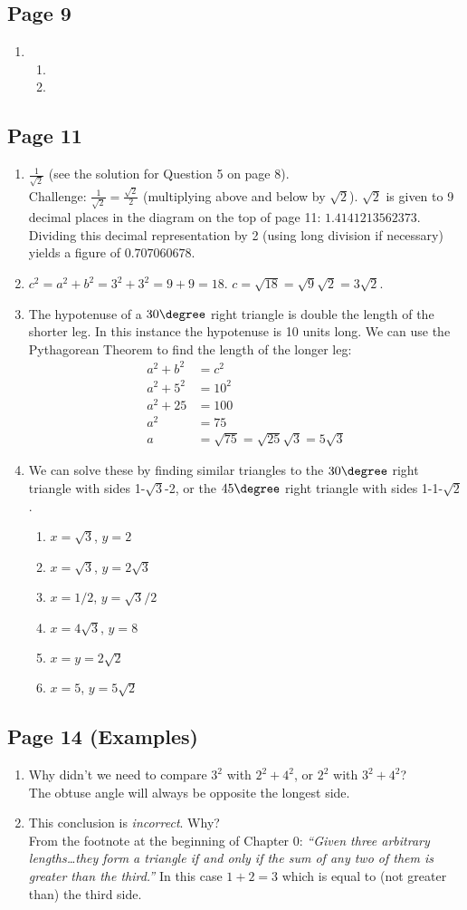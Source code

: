 \documentclass{article}
\newenvironment{solutions}[1]
{\subsection*{#1}
 \begin{enumerate}[leftmargin=1.5em]}
{\end{enumerate}}
\newcommand{\solution}{\item}
\newenvironment{subsolutions}
{\begin{enumerate}}
{\end{enumerate}}
\newcommand{\subsolution}{\item}
\begin{document}
\begin{solutions}{Page 9}
\solution %
\begin{subsolutions}
\subsolution
\subsolution


\end{subsolutions}

\end{solutions}

\begin{solutions}{Page 11}
\solution %
$\frac{1}{\sqrt{2}}$ (see the solution for Question 5 on page 8).\\
\noindent Challenge: $\frac{1}{\sqrt{2}} = \frac{\sqrt{2}}{2}$ (multiplying above and below by $\sqrt{2}$).  $\sqrt{2}$ is given to 9 decimal places in the diagram on the top of page 11: $1.4141213562373$. Dividing this decimal representation by 2 (using long division if necessary) yields a figure of $0.707060678$.
 
\solution %
$c^2 = a^2 + b^2 = 3^2 + 3^2 = 9 + 9 = 18$. $c = \sqrt{18} = \sqrt{9}\sqrt{2} = 3\sqrt{2}$.

\solution %
The hypotenuse of a $30\degree$ right triangle is double the length of the shorter leg. In this instance the hypotenuse is 10 units long. We can use the Pythagorean Theorem to find the length of the longer leg:
\begin{align*}
a^2 + b^2 &= c^2\\
a^2 + 5^2 &= 10^2\\
a^2 + 25 &= 100\\
a^2 &= 75\\
a &= \sqrt{75} = \sqrt{25}\sqrt{3} = 5\sqrt{3}
\end{align*}

\solution %
We can solve these by finding  similar triangles to the $30\degree$ right triangle with sides 1-$\sqrt{3}$-2, or the $45\degree$ right triangle with sides 1-1-$\sqrt{2}$.
\begin{subsolutions}
\subsolution $x=\sqrt{3}$, $y=2$
\subsolution $x=\sqrt{3}$, $y=2\sqrt{3}$
\subsolution $x=1/2$, $y=\sqrt{3}/2$
\subsolution $x=4\sqrt{3}$, $y=8$
\subsolution $x = y = 2\sqrt{2}$
\subsolution $x=5$, $y=5\sqrt{2}$
\end{subsolutions}
\end{solutions}

\begin{solutions}{Page 14 (Examples)}
\solution Why didn't we need to compare $3^2$ with $2^2 + 4^2$, or $2^2$ with $3^2 + 4^2$?\\
The obtuse angle will always be opposite the longest side. 
\solution This conclusion is \textit{incorrect}. Why?\\
From the footnote at the beginning of Chapter 0: \textit{``Given three arbitrary lengths\ldots they form a triangle if and only if the sum of any two of them is greater than the third.''}
In this case $1 + 2 = 3$ which is equal to (not greater than) the third side.
\end{solutions}
\end{document}
